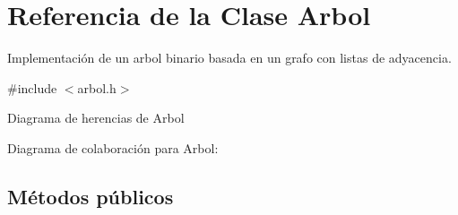 \hypertarget{classArbol}{}\section{Referencia de la Clase Arbol}
\label{classArbol}


Implementación de un arbol binario basada en un grafo con listas de adyacencia.  




{\ttfamily \#include $<$arbol.\+h$>$}



Diagrama de herencias de Arbol


Diagrama de colaboración para Arbol\+:
\subsection*{Métodos públicos}
